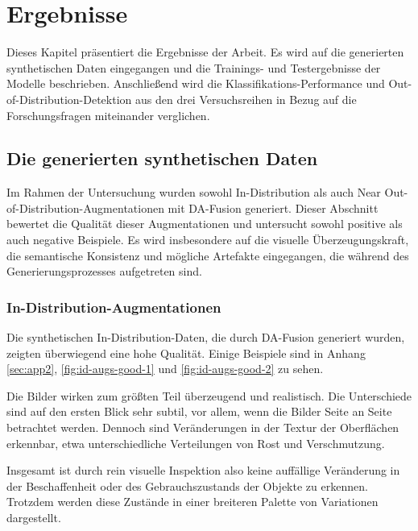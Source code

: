 \chapter{Ergebnisse} \label{ch:results}

Dieses Kapitel präsentiert die Ergebnisse der Arbeit. Es wird auf die generierten synthetischen Daten eingegangen und die Trainings- und Testergebnisse der Modelle beschrieben. Anschließend wird die Klassifikations-Performance und Out-of-Distribution-Detektion aus den drei Versuchsreihen in Bezug auf die Forschungsfragen miteinander verglichen.

\section{Die generierten synthetischen Daten} \label{sec:da-fusion-results}

Im Rahmen der Untersuchung wurden sowohl In-Distribution als auch Near Out-of-Distribution-Augmentationen mit DA-Fusion generiert. Dieser Abschnitt bewertet die Qualität dieser Augmentationen und untersucht sowohl positive als auch negative Beispiele. Es wird insbesondere auf die visuelle Überzeugungskraft, die semantische Konsistenz und mögliche Artefakte eingegangen, die während des Generierungsprozesses aufgetreten sind.

\subsection{In-Distribution-Augmentationen} \label{subsec:da-fusion-id-results}

Die synthetischen In-Distribution-Daten, die durch DA-Fusion generiert wurden, zeigten überwiegend eine hohe Qualität. Einige Beispiele sind in Anhang \ref{sec:app2}, \autoref{fig:id-augs-good-1} und \ref{fig:id-augs-good-2} zu sehen.

Die Bilder wirken zum größten Teil überzeugend und realistisch. Die Unterschiede sind auf den ersten Blick sehr subtil, vor allem, wenn die Bilder Seite an Seite betrachtet werden. Dennoch sind Veränderungen in der Textur der Oberflächen erkennbar, etwa unterschiedliche Verteilungen von Rost und Verschmutzung.

Insgesamt ist durch rein visuelle Inspektion also keine auffällige Veränderung in der Beschaffenheit oder des Gebrauchszustands der Objekte zu erkennen. Trotzdem werden diese Zustände in einer breiteren Palette von Variationen dargestellt.

